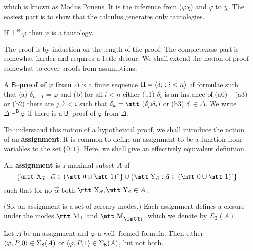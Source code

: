 which is known as Modus Ponens. It is the inference from 
{\mtt ($\varphi$$\chi$)} and $\varphi$ to
$\chi$. The easiest part is to show that the calculus generates
only tautologies.
\begin{lem}
If $\vdash^{\mathsf{B}} \varphi$ then $\varphi$ is a tautology.
\end{lem}
The proof is by induction on the length of the proof. The completeness
part is somewhat harder and requires a little detour. We shall extend 
the notion of proof somewhat to cover proofs from assumptions.
\begin{defn}
A $\mathsf{B}$--\textbf{proof of} $\varphi$ \textbf{from} $\Delta$ is a
finite sequence $\Pi = \langle \delta_i : i < n\rangle$ of formulae such
that (a) $\delta_{n-1} = \varphi$ and (b) for all $i < n$ either
(b1) $\delta_i$ is an instance of (a0) -- (a3) or (b2) there are
$j, k < i$ such that $\delta_k = \mbox{\mtt ($\delta_j$\symbol{25}%
$\delta_i$)}$ or (b3) $\delta_i \in \Delta$. We write
$\Delta \vdash^{\mathsf{B}} \varphi$ if there is a 
$\mathsf{B}$--proof of $\varphi$ from $\Delta$.
\end{defn}
To understand this notion of a hypothetical proof, we shall introduce
the notion of an \textbf{assignment}. It is common to define an assignment
to be a function from variables to the set $\{0,1\}$. Here, we
shall give an effectively equivalent definition.
\begin{defn}
An \textbf{assignment} is a maximal subset $A$ of
\begin{equation}
\{\mbox{\mtt X}_{\vec{\alpha}}
: \vec{\alpha} \in (\mbox{\mtt 0} \cup \mbox{\mtt 1})^{\ast}\}
\cup
\{\mbox{\mtt Y}_{\vec{\alpha}}
: \vec{\alpha} \in (\mbox{\mtt 0} \cup \mbox{\mtt 1})^{\ast}\}
\end{equation}
such that for no $\vec{\alpha}$ both
$\mbox{\mtt X}_{\vec{\alpha}}, \mbox{\mtt Y}_{\vec{\alpha}}
\in A$.
\end{defn}
(So, an assignment is a set of zeroary modes.) Each assignment
defines a closure under the modes $\mbox{\mtt M}_{\bot}$ and
$\mbox{\mtt M}_{\mbox{\smtt\symbol{25}}}$, which we denote by 
$\Sigma_{\mathsf{B}}(A)$.
\begin{lem}
Let $A$ be an assignment and $\varphi$ a well--formed formula. Then
either $\langle\varphi, P,0\rangle \in \Sigma_{\mathsf{B}}(A)$ or
$\langle\varphi, P, 1\rangle \in \Sigma_{\mathsf{B}}(A)$, but not both.
\end{lem}
